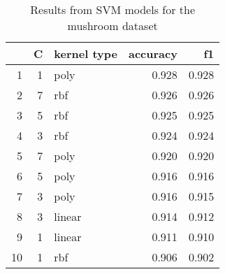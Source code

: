 \begin{table}
\centering
\caption{Results from SVM models for the mushroom dataset}
\label{tab:svm_results_mushroom}
\begin{tabular}{rrlrr}
\toprule
 & C & kernel type & accuracy & f1 \\
\midrule
1 & 1 & poly & 0.928 & 0.928 \\
2 & 7 & rbf & 0.926 & 0.926 \\
3 & 5 & rbf & 0.925 & 0.925 \\
4 & 3 & rbf & 0.924 & 0.924 \\
5 & 7 & poly & 0.920 & 0.920 \\
6 & 5 & poly & 0.916 & 0.916 \\
7 & 3 & poly & 0.916 & 0.915 \\
8 & 3 & linear & 0.914 & 0.912 \\
9 & 1 & linear & 0.911 & 0.910 \\
10 & 1 & rbf & 0.906 & 0.902 \\
\bottomrule
\end{tabular}
\end{table}
